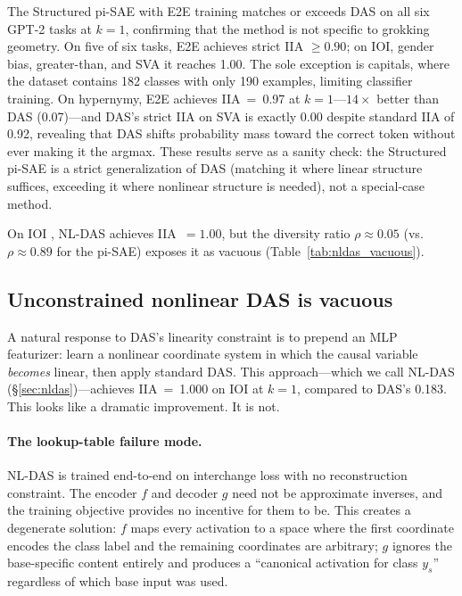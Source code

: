 \documentclass{article}
\begin{document}
The Structured pi-SAE with E2E training matches or exceeds DAS on all six
GPT-2 tasks at $k{=}1$, confirming that the method is not specific to
grokking geometry. On five of six tasks, E2E achieves strict IIA $\geq 0.90$;
on IOI, gender bias, greater-than, and SVA it reaches 1.00. The sole
exception is capitals, where the dataset contains 182 classes with only 190
examples, limiting classifier training. On hypernymy, E2E achieves
IIA~=~0.97 at $k{=}1$---$14\times$ better than DAS (0.07)---and DAS's strict
IIA on SVA is exactly 0.00 despite standard IIA of 0.92, revealing that DAS
shifts probability mass toward the correct token without ever making it the
argmax. These results serve as a sanity check: the Structured pi-SAE is a
strict generalization of DAS (matching it where linear structure suffices,
exceeding it where nonlinear structure is needed), not a special-case method.

On IOI \citep{wang2022interpretability}, NL-DAS achieves IIA~$= 1.00$,
but the diversity ratio $\rho \approx 0.05$ (vs.\ $\rho \approx 0.89$ for the
pi-SAE) exposes it as vacuous (Table~\ref{tab:nldas_vacuous}).

\subsection{Unconstrained nonlinear DAS is vacuous}
\label{sec:nldas_vacuous}

A natural response to DAS's linearity constraint is to prepend an MLP
featurizer: learn a nonlinear coordinate system in which the causal variable
\emph{becomes} linear, then apply standard DAS. This approach---which we call
NL-DAS (\S\ref{sec:nldas})---achieves IIA~=~1.000 on IOI at $k = 1$, compared
to DAS's 0.183. This looks like a dramatic improvement. It is not.

\paragraph{The lookup-table failure mode.}
NL-DAS is trained end-to-end on interchange loss with no reconstruction
constraint. The encoder $f$ and decoder $g$ need not be approximate inverses,
and the training objective provides no incentive for them to be. This creates a
degenerate solution: $f$ maps every activation to a space where the first
coordinate encodes the class label and the remaining coordinates are arbitrary;
$g$ ignores the base-specific content entirely and produces a ``canonical
activation for class $y_s$'' regardless of which base input was used.
\end{document}
